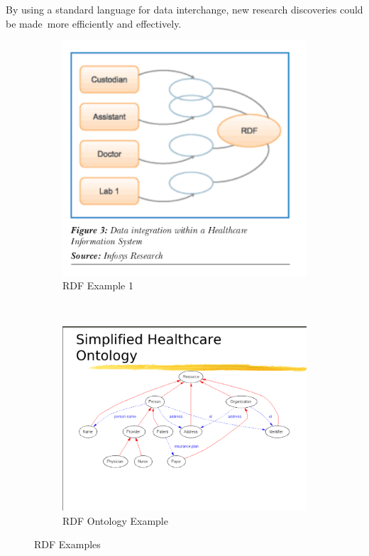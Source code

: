   \noindent By using a standard language for data interchange, new research discoveries could be made\
  more efficiently and effectively.\

  \begin{figure}[h!]
    \begin{subfigure}[b]{.5\linewidth}
      \includegraphics[width=1.0\textwidth]{rdfh.png}
      \caption{RDF Example 1~ \citep{parachuri2008role}}
      \label{fig:third}
    \end{subfigure}
    ~
    \begin{subfigure}[b]{.5\linewidth}
      \includegraphics[trim=4 1 1 7,clip,width=\textwidth]{rdf1.png}
      \caption{RDF Ontology Example~\citep{_Borden_2013}}
      \label{fig:fourth}
    \end{subfigure}
    \caption{RDF Examples}
    \label{fig:rdf_examples}
  \end{figure}


